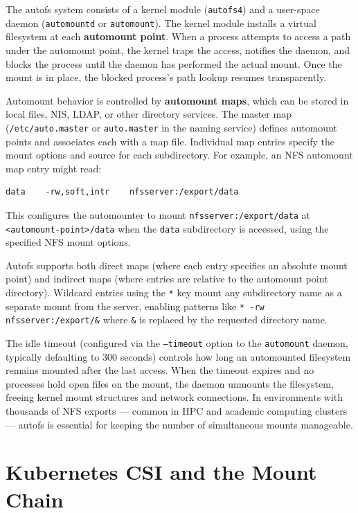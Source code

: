 The autofs system consists of a kernel module (\texttt{autofs4}) and a user-space daemon (\texttt{automountd} or \texttt{automount}). The kernel module installs a virtual filesystem at each \textbf{automount point}. When a process attempts to access a path under the automount point, the kernel traps the access, notifies the daemon, and blocks the process until the daemon has performed the actual mount. Once the mount is in place, the blocked process's path lookup resumes transparently.

Automount behavior is controlled by \textbf{automount maps}, which can be stored in local files, NIS, LDAP, or other directory services. The master map (\texttt{/etc/auto.master} or \texttt{auto.master} in the naming service) defines automount points and associates each with a map file. Individual map entries specify the mount options and source for each subdirectory. For example, an NFS automount map entry might read:

\begin{verbatim}
data    -rw,soft,intr    nfsserver:/export/data
\end{verbatim}

This configures the automounter to mount \texttt{nfsserver:/export/data} at \texttt{<automount-point>/data} when the \texttt{data} subdirectory is accessed, using the specified NFS mount options.

Autofs supports both direct maps (where each entry specifies an absolute mount point) and indirect maps (where entries are relative to the automount point directory). Wildcard entries using the \texttt{*} key mount any subdirectory name as a separate mount from the server, enabling patterns like \texttt{*  -rw  nfsserver:/export/\&} where \texttt{\&} is replaced by the requested directory name.

The idle timeout (configured via the \texttt{--timeout} option to the \texttt{automount} daemon, typically defaulting to 300 seconds) controls how long an automounted filesystem remains mounted after the last access. When the timeout expires and no processes hold open files on the mount, the daemon unmounts the filesystem, freeing kernel mount structures and network connections. In environments with thousands of NFS exports --- common in HPC and academic computing clusters --- autofs is essential for keeping the number of simultaneous mounts manageable.

\section{Kubernetes CSI and the Mount Chain}

